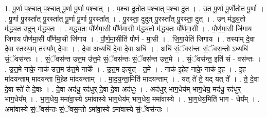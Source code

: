 \documentclass[17pt]{extarticle}
\begin{document}
1. पू॒र्णा प॒श्चात् प॒श्चात् पू॒र्णा पू॒र्णा प॒श्चात् । . प॒श्चा दु॒तोत प॒श्चात् प॒श्चा दु॒त । . उ॒त पू॒र्णा पू॒र्णोतोत पू॒र्णा । . पू॒र्णा पु॒रस्ता᳚त् पु॒रस्ता᳚त् पू॒र्णा पू॒र्णा पु॒रस्ता᳚त् । . पु॒रस्ता॒ दुदुत् पु॒रस्ता᳚त् पु॒रस्ता॒ दुत् । . उन् म॑द्ध्य॒तो म॑द्ध्य॒त उदुन् म॑द्ध्य॒तः । . म॒द्ध्य॒तः पौ᳚र्णमा॒सी पौ᳚र्णमा॒सी म॑द्ध्य॒तो म॑द्ध्य॒तः पौ᳚र्णमा॒सी । . पौ॒र्ण॒मा॒सी जि॑गाय जिगाय पौर्णमा॒सी पौ᳚र्णमा॒सी जि॑गाय । . पौ॒र्ण॒मा॒सीति॑ पौर्ण - मा॒सी । . जि॒गा॒येति॑ जिगाय । . तस्या᳚म् दे॒वा दे॒वा स्तस्या॒म् तस्या᳚म् दे॒वाः । . दे॒वा अध्यधि॑ दे॒वा दे॒वा अधि॑ । . अधि॑ सं॒ॅवस॑न्तः सं॒ॅवस॒न्तो ऽध्यधि॑ सं॒ॅवस॑न्तः । . सं॒ॅवस॑न्त उत्त॒म उ॑त्त॒मे सं॒ॅवस॑न्तः सं॒ॅवस॑न्त उत्त॒मे । . सं॒ॅवस॑न्त॒ इति॑ सं - वस॑न्तः । . उ॒त्त॒मे नाके॒ नाक॑ उत्त॒म उ॑त्त॒मे नाके᳚ । . उ॒त्त॒म इत्यु॑त् - त॒मे । . नाक॑ इ॒हेह नाके॒ नाक॑ इ॒ह । . इ॒ह मा॑दयन्ताम् मादयन्ता मि॒हेह मा॑दयन्ताम् । . मा॒द॒य॒न्ता॒मिति॑ मादयन्ताम् । . यत् ते॑ ते॒ यद् यत् ते᳚ । . ते॒ दे॒वा दे॒वा स्ते॑ ते दे॒वाः । . दे॒वा अद॑धु॒ रद॑धुर् दे॒वा दे॒वा अद॑धुः । . अद॑धुर् भाग॒धेय॑म् भाग॒धेय॒ मद॑धु॒ रद॑धुर् भाग॒धेय᳚म् । . भा॒ग॒धेय॒ ममा॑वा॒स्ये ऽमा॑वास्ये भाग॒धेय॑म् भाग॒धेय॒ ममा॑वास्ये । . भा॒ग॒धेय॒मिति॑ भाग - धेय᳚म् । . अमा॑वास्ये सं॒ॅवस॑न्तः सं॒ॅवस॒न्तो ऽमा॑वा॒स्ये ऽमा॑वास्ये सं॒ॅवस॑न्तः । \newline
\end{document}
